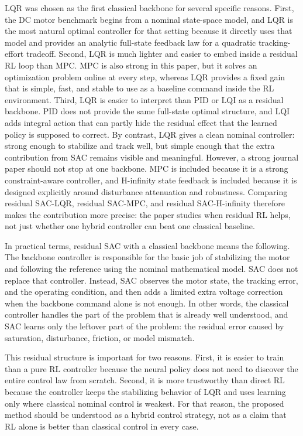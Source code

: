 \documentclass[conference]{IEEEtran}
\begin{document}
LQR was chosen as the first classical backbone for several specific reasons. First, the DC motor benchmark begins from a nominal state-space model, and LQR is the most natural optimal controller for that setting because it directly uses that model and provides an analytic full-state feedback law for a quadratic tracking-effort tradeoff. Second, LQR is much lighter and easier to embed inside a residual RL loop than MPC. MPC is also strong in this paper, but it solves an optimization problem online at every step, whereas LQR provides a fixed gain that is simple, fast, and stable to use as a baseline command inside the RL environment. Third, LQR is easier to interpret than PID or LQI as a residual backbone. PID does not provide the same full-state optimal structure, and LQI adds integral action that can partly hide the residual effect that the learned policy is supposed to correct. By contrast, LQR gives a clean nominal controller: strong enough to stabilize and track well, but simple enough that the extra contribution from SAC remains visible and meaningful. However, a strong journal paper should not stop at one backbone. MPC is included because it is a strong constraint-aware controller, and H-infinity state feedback is included because it is designed explicitly around disturbance attenuation and robustness. Comparing residual SAC-LQR, residual SAC-MPC, and residual SAC-H-infinity therefore makes the contribution more precise: the paper studies when residual RL helps, not just whether one hybrid controller can beat one classical baseline.

In practical terms, residual SAC with a classical backbone means the following. The backbone controller is responsible for the basic job of stabilizing the motor and following the reference using the nominal mathematical model. SAC does not replace that controller. Instead, SAC observes the motor state, the tracking error, and the operating condition, and then adds a limited extra voltage correction when the backbone command alone is not enough. In other words, the classical controller handles the part of the problem that is already well understood, and SAC learns only the leftover part of the problem: the residual error caused by saturation, disturbance, friction, or model mismatch.

This residual structure is important for two reasons. First, it is easier to train than a pure RL controller because the neural policy does not need to discover the entire control law from scratch. Second, it is more trustworthy than direct RL because the controller keeps the stabilizing behavior of LQR and uses learning only where classical nominal control is weakest. For that reason, the proposed method should be understood as a hybrid control strategy, not as a claim that RL alone is better than classical control in every case.
\end{document}
